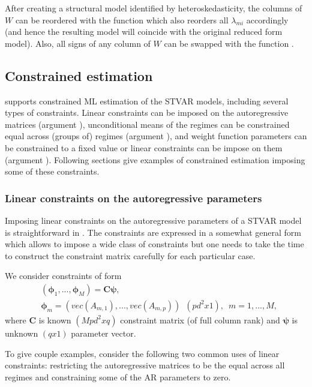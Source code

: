 \documentclass[nojss]{jss}
\begin{document}
After creating a structural model identified by heteroskedasticity, the columns of $W$ can be reordered with the function  which also reorders all $\lambda_{mi}$ accordingly (and hence the resulting model will coincide with the original reduced form model). Also, all signs of any column of $W$ can be swapped with the function .

\subsection{Constrained estimation}\label{sec:examp_const}
 supports constrained ML estimation of the STVAR models, including several types of constraints. Linear constraints can be imposed on the autoregressive matrices (argument ), unconditional means of the regimes can be constrained equal across (groups of) regimes (argument ), and weight function parameters can be constrained to a fixed value or linear constraints can be impose on them (argument ). Following sections give examples of constrained estimation imposing some of these constraints.

\subsubsection{Linear constraints on the autoregressive parameters}
Imposing linear constraints on the autoregressive parameters of a STVAR model is straightforward in . The constraints are expressed in a somewhat general form which allows to impose a wide class of constraints but one needs to take the time to construct the constraint matrix carefully for each particular case.

We consider constraints of form
\begin{align}
& (\boldsymbol{\phi}_1,...,\boldsymbol{\phi}_M) = \boldsymbol{C}\boldsymbol{\psi},\\
& \boldsymbol{\phi}_m=(vec(A_{m,1}),...,vec(A_{m,p}))\enspace (pd^2x1), \enspace m=1,...,M,
\end{align}
where $\boldsymbol{C}$ is known $(Mpd^2xq)$ constraint matrix (of full column rank) and $\boldsymbol{\psi}$ is unknown $(qx1)$ parameter vector.

To give couple examples, consider the following two common uses of linear constraints: restricting the autoregressive matrices to be the equal across all regimes and constraining some of the AR parameters to zero.
\end{document}
